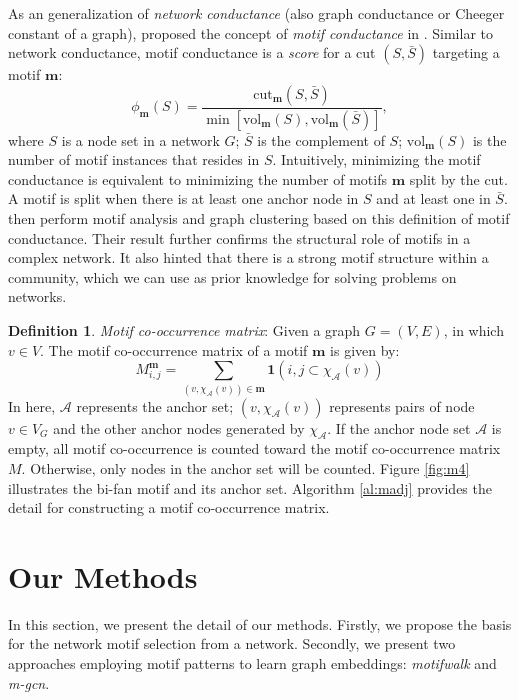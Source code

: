 \documentclass{article}
\theoremstyle{definition}
\newtheorem{definition}{Definition}[section]
\begin{document}
As an generalization of \emph{network conductance} (also graph conductance 
or Cheeger constant of a graph), \citeauthor{juremotif} proposed
the concept of \emph{motif conductance} in \cite{juremotif}. Similar to
network conductance, motif conductance is a \emph{score} for a cut 
$(S, \bar{S})$ targeting a motif $\mathbf{m}$:
\begin{equation*}
	\phi_{\mathbf{m}}(S) = \frac{\mbox{cut}_{\mathbf{m}}(S,\bar{S})}{\min[\mbox{vol}_{\mathbf{m}}(S), \mbox{vol}_{\mathbf{m}}(\bar{S})]},
\end{equation*}
where $S$ is a node set in a network $G$; $\bar{S}$ is the complement
of $S$; $\mbox{vol}_{\mathbf{m}}(S)$ is the number of motif instances
that resides in $S$. Intuitively, minimizing the motif conductance is
equivalent to minimizing the number of motifs $\mathbf{m}$ split
by the cut. A motif is split when there is at least one
anchor node in $S$ and at least one in $\bar{S}$. \citeauthor{juremotif}
then perform motif analysis and graph clustering based on this
definition of motif conductance. Their result further confirms the
structural role of motifs in a complex network. It also hinted that there
is a strong motif structure within a community, which we can use as
prior knowledge for solving problems on networks.

\begin{definition} \emph{Motif co-occurrence matrix}:
Given a graph $G = (V,E)$, in which $v \in V$. The motif co-occurrence 
matrix of a motif $\mathbf{m}$ is given by:
$$M_{i,j}^{\mathbf{m}} = \sum_{(v, \chi_{\mathcal{A}}(v)) \in \mathbf{m}} \mathbf{1}({i,j} \subset \chi_\mathcal{A}(v))$$
In here, $\mathcal{A}$ represents the anchor set; 
$(v, \chi_{\mathcal{A}}(v))$ represents pairs of node $v \in V_G$ and the 
other anchor nodes generated by $\chi_\mathcal{A}$. If the anchor node set 
$\mathcal{A}$ is empty, all motif co-occurrence is counted toward the 
motif co-occurrence matrix $M$. Otherwise, only nodes in the anchor set 
will be counted. Figure \ref{fig:m4} illustrates the bi-fan motif and 
its anchor set. Algorithm \ref{al:madj} provides the detail for constructing
a motif co-occurrence matrix.
\end{definition}

\section{Our Methods}

In this section, we present the detail of our methods. Firstly,
we propose the basis for the network motif selection from a network.
Secondly, we present two approaches employing motif patterns to
learn graph embeddings: \emph{motifwalk} and \emph{m-gcn}.
\end{document}
